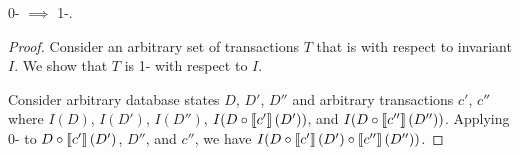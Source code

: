 \begin{claim}\label{clm:0-isafety-implies-1-iconvergence}
  0-\isafety{} $\implies$ 1-\iconvergence{}.
\end{claim}
\begin{proof}
  Consider an arbitrary set of \imp{} transactions $T$ that is \iconfluent{}
  with respect to invariant $I$. We show that $T$ is 1-\iconvergent{} with
  respect to $I$.

  Consider arbitrary database states $D$, $D'$, $D''$ and arbitrary
  transactions $c'$, $c''$ where $I(D)$, $I(D')$, $I(D'')$, $I(D \circ
  \left\llbracket c'\right\rrbracket(D'))$, and $I(D \circ \left\llbracket c''\right\rrbracket(D''))$. Applying 0-\isafety{}
  to $D \circ \left\llbracket c'\right\rrbracket(D')$, $D''$, and $c''$, we have $I(D \circ
  \left\llbracket c'\right\rrbracket(D') \circ \left\llbracket c''\right\rrbracket(D''))$.
\end{proof}

